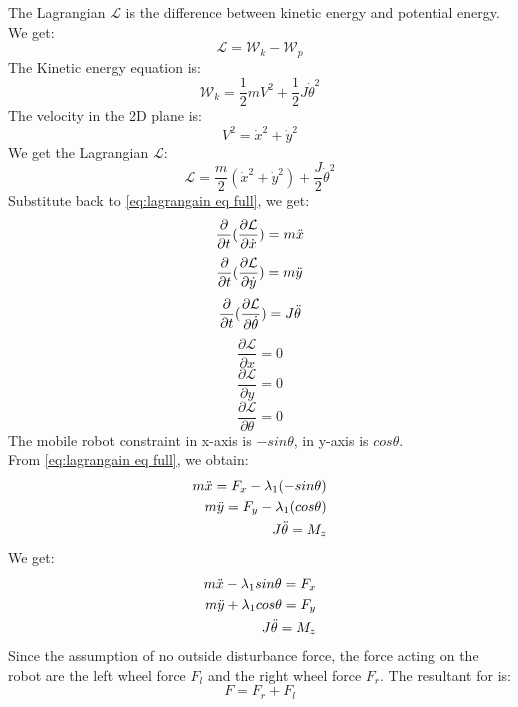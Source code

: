 The Lagrangian \(\mathcal{L}\) is the difference between kinetic energy and potential energy. We get:
\begin{equation}
	\mathcal{L} = \mathcal{W}_k - \mathcal{W}_p 
\end{equation}
The Kinetic energy equation is:
\begin{equation}
	\mathcal{W}_k = \frac{1}{2}mV^2 + \frac{1}{2} J\Dot{\theta}^2
\end{equation}
The velocity in the 2D plane is:
\begin{equation}
	V^2 = \Dot{x}^2 + \Dot{y}^2
\end{equation}
We get the Lagrangian \(\mathcal{L}\):
\begin{equation}
	\mathcal{L} = \frac{m}{2}(\Dot{x}^2 + \Dot{y}^2) + \frac{J}{2}\Dot{\theta}^2
\end{equation}
Substitute back to \ref{eq:lagrangain eq full}, we get:
\[\frac{\partial}{\partial t}(\frac{\partial \mathcal{L}}{\partial \Dot{x}}) = m\Ddot{x}\] 
\[\frac{\partial}{\partial t}(\frac{\partial \mathcal{L}}{\partial \Dot{y}}) = m\Ddot{y}\] 
\[\frac{\partial}{\partial t}(\frac{\partial \mathcal{L}}{\partial \Dot{\theta}}) = J\Ddot{\theta}\]
\[\frac{\partial \mathcal{L}}{\partial x} = 0\] 
\[\frac{\partial \mathcal{L}}{\partial y} = 0\] 
\[\frac{\partial \mathcal{L}}{\partial \theta} = 0\] 
The mobile robot constraint in x-axis is \(-sin\theta\), in y-axis is \(cos\theta\).\\
From \ref{eq:lagrangain eq full}, we obtain:
\begin{equation}
	\begin{split}
		m\Ddot{x} = F_x - \lambda_1(-sin\theta) \\
		m\Ddot{y} = F_y - \lambda_1(cos\theta)\\
		J\Ddot{\theta} = M_z
	\end{split}
\end{equation}
We get:
\begin{equation}
	\begin{split}
		m\Ddot{x} - \lambda_1 sin \theta= F_x\\
		m\Ddot{y} + \lambda_1 cos \theta= F_y\\
		J\Ddot{\theta} = M_z
	\end{split}
\end{equation}
Since the assumption of no outside disturbance force, the force acting on the robot are the left wheel force \(F_l\) and the right wheel force \(F_r\). The resultant for is:
\begin{equation}
	F = F_r + F_l
\end{equation}
